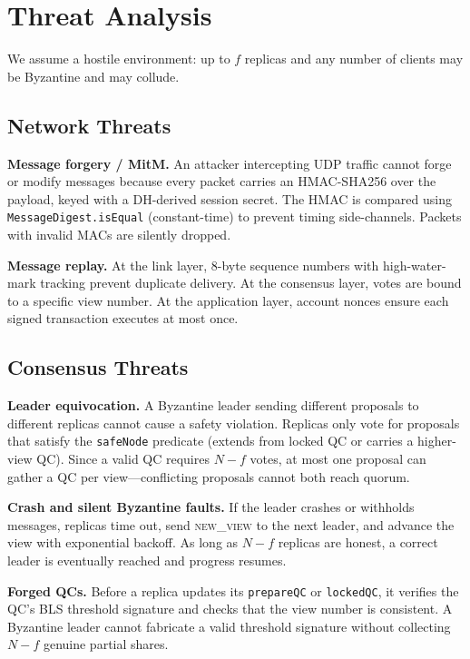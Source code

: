 \documentclass{llncs}
\begin{document}
\section{Threat Analysis}

We assume a hostile environment: up to $f$ replicas and any number of clients may be Byzantine and may collude.

\subsection{Network Threats}

\textbf{Message forgery / MitM.} An attacker intercepting UDP traffic cannot forge or modify messages because every packet carries an HMAC-SHA256 over the payload, keyed with a DH-derived session secret. The HMAC is compared using \texttt{MessageDigest.isEqual} (constant-time) to prevent timing side-channels. Packets with invalid MACs are silently dropped.

\textbf{Message replay.} At the link layer, 8-byte sequence numbers with high-water-mark tracking prevent duplicate delivery. At the consensus layer, votes are bound to a specific view number. At the application layer, account nonces ensure each signed transaction executes at most once.

\subsection{Consensus Threats}

\textbf{Leader equivocation.} A Byzantine leader sending different proposals to different replicas cannot cause a safety violation. Replicas only vote for proposals that satisfy the \texttt{safeNode} predicate (extends from locked QC or carries a higher-view QC). Since a valid QC requires $N{-}f$ votes, at most one proposal can gather a QC per view---conflicting proposals cannot both reach quorum.

\textbf{Crash and silent Byzantine faults.} If the leader crashes or withholds messages, replicas time out, send \textsc{new\_view} to the next leader, and advance the view with exponential backoff. As long as $N{-}f$ replicas are honest, a correct leader is eventually reached and progress resumes.

\textbf{Forged QCs.} Before a replica updates its \texttt{prepareQC} or \texttt{lockedQC}, it verifies the QC's BLS threshold signature and checks that the view number is consistent. A Byzantine leader cannot fabricate a valid threshold signature without collecting $N{-}f$ genuine partial shares.
\end{document}
